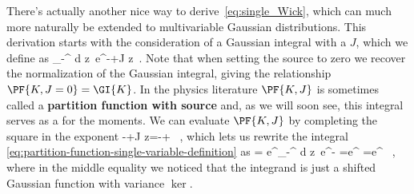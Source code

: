 There's actually another nice way to derive~\eqref{eq:single_Wick}, which can much more naturally be extended to multivariable Gaussian distributions.
This derivation starts with the consideration of a Gaussian integral with a  $J$, which we define as
\be\label{eq:partition-function-single-variable-definition}
 \equiv \int_{-\infty}^{\infty} d z\ e^{-+J z}\, .
\ee
Note that when setting the source to zero we recover the normalization of the Gaussian integral, giving the relationship $\PF{K,J=0}=\GI{K}$.
In the physics literature $\PF{K,J}$ is sometimes called a \textbf{partition function with source} and, as we will soon see, this integral serves as a  for the moments. 
We can evaluate $\PF{K,J}$ by completing the square in the exponent
\be
-+J z=-+ \, ,
\ee
which lets us rewrite the integral \eqref{eq:partition-function-single-variable-definition} as
\be
{} = e^{}\int_{-\infty}^{\infty} d z\ e^{-}
 =e^{}  
 =e^{} \sqrt{2\pi\ker} \, ,
\ee
where in the middle equality we noticed that the integrand is just a shifted Gaussian function with variance $\ker$.

